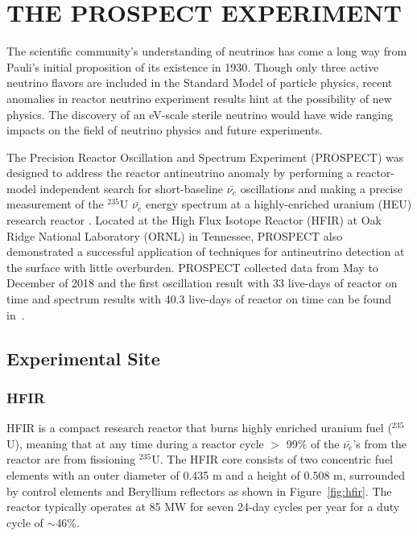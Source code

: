 \chapter{THE PROSPECT EXPERIMENT}

The scientific community's understanding of neutrinos has come a long way from Pauli's initial proposition of its existence in 1930. 
Though only three active neutrino flavors are included in the Standard Model of particle physics, recent anomalies in reactor neutrino experiment results hint at the possibility of new physics. 
The discovery of an eV-scale sterile neutrino would have wide ranging impacts on the field of neutrino physics and future experiments.

The Precision Reactor Oscillation and Spectrum Experiment (PROSPECT) was designed to address the reactor antineutrino anomaly by performing a reactor-model independent search for short-baseline $\bar{\nu_{e}}$ oscillations and making a precise measurement of the $^{235}$U $\bar{\nu_{e}}$ energy spectrum at a highly-enriched uranium (HEU) research reactor \cite{LongNIM}.
Located at the High Flux Isotope Reactor (HFIR) at Oak Ridge National Laboratory (ORNL) in Tennessee, PROSPECT also demonstrated a successful application of techniques for antineutrino detection at the surface with little overburden. 
PROSPECT collected data from May to December of 2018 and the first oscillation result with 33 live-days of reactor on time and spectrum results with 40.3 live-days of reactor on time can be found in~\cite{PhysRevLett.121.251802,Ashenfelter:2018jrx}.

\section{Experimental Site}
\subsection{HFIR}

HFIR is a compact research reactor that burns highly enriched uranium fuel ($^{235}$U), meaning that at any time during a reactor cycle $>$ 99\% of the $\bar{\nu_{e}}$'s from the reactor are from fissioning $^{235}$U.
The HFIR core consists of two concentric fuel elements with an outer diameter of 0.435 m and a height of 0.508 m, surrounded by control elements and Beryllium reflectors as shown in Figure~\ref{fig:hfir}. 
The reactor typically operates at 85 MW for seven 24-day cycles per year for a duty cycle of $\sim$46\%.

